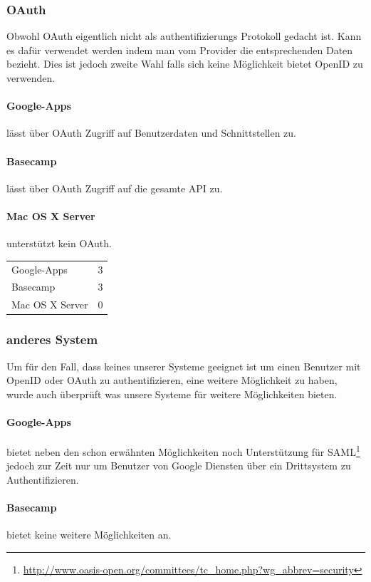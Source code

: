 \subsubsection{OAuth}
\label{ssub:Bewertung OAuth}
Obwohl OAuth eigentlich nicht als authentifizierungs Protokoll gedacht ist. Kann es dafür verwendet werden indem man vom Provider die entsprechenden Daten bezieht. Dies ist jedoch zweite Wahl falls sich keine Möglichkeit bietet OpenID zu verwenden.
\paragraph{Google-Apps}
\label{par:2.2Google-Apps}
lässt über OAuth Zugriff auf Benutzerdaten und Schnittstellen zu.
\paragraph{Basecamp}
\label{par:2.2Basecamp}
lässt über OAuth Zugriff auf die gesamte API zu.
\paragraph{Mac OS X Server}
\label{par:2.2Mac OS X Server}
unterstützt kein OAuth.

\begin{tabular}{lc}
Google-Apps & 3\\
Basecamp & 3\\
Mac OS X Server & 0\\
\end{tabular}

\subsubsection{anderes System}
\label{ssub:anderes System}
Um für den Fall, dass keines unserer Systeme geeignet ist um einen Benutzer mit OpenID oder OAuth zu authentifizieren, eine weitere Möglichkeit zu haben, wurde auch überprüft was unsere Systeme für weitere Möglichkeiten bieten.
\paragraph{Google-Apps}
\label{par:2.3Google-Apps}
bietet neben den schon erwähnten Möglichkeiten noch Unterstützung für SAML\footnote{\url{http://www.oasis-open.org/committees/tc_home.php?wg_abbrev=security}} jedoch zur Zeit nur um Benutzer von Google Diensten über ein Drittsystem zu Authentifizieren.
\paragraph{Basecamp}
\label{par:2.3Basecamp}
bietet keine weitere Möglichkeiten an.
